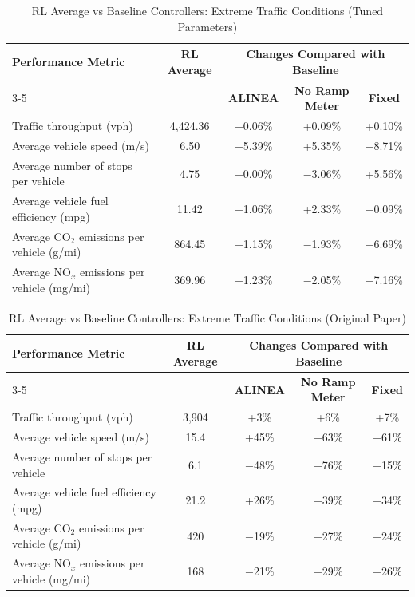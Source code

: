 \begin{table}[H]
\centering
\small
\caption{RL Average vs Baseline Controllers: Extreme Traffic Conditions (Tuned Parameters)}
\begin{tabular}{l c c c c}
\toprule
\multirow{2}{*}{\textbf{Performance Metric}} & \multirow{2}{*}{\textbf{RL Average}} & \multicolumn{3}{c}{\textbf{Changes Compared with Baseline}} \\
\cmidrule(lr){3-5}
 & & \textbf{ALINEA} & \textbf{No Ramp Meter} & \textbf{Fixed} \\
\midrule
Traffic throughput (vph)                      & 4{,}424.36 & +0.06\%    & +0.09\%   & +0.10\%   \\
Average vehicle speed (m/s)                   & 6.50       & $-$5.39\%  & +5.35\%   & $-$8.71\% \\
Average number of stops per vehicle           & 4.75       & +0.00\%    & $-$3.06\% & +5.56\%   \\
Average vehicle fuel efficiency (mpg)         & 11.42      & +1.06\%    & +2.33\%   & $-$0.09\% \\
Average CO$_2$ emissions per vehicle (g/mi)   & 864.45     & $-$1.15\%  & $-$1.93\% & $-$6.69\% \\
Average NO$_x$ emissions per vehicle (mg/mi)  & 369.96     & $-$1.23\%  & $-$2.05\% & $-$7.16\% \\
\bottomrule
\end{tabular}
\end{table}

\begin{table}[H]
\centering
\small
\caption{RL Average vs Baseline Controllers: Extreme Traffic Conditions (Original Paper)}
\begin{tabular}{l c c c c}
\toprule
\multirow{2}{*}{\textbf{Performance Metric}} & \multirow{2}{*}{\textbf{RL Average}} & \multicolumn{3}{c}{\textbf{Changes Compared with Baseline}} \\
\cmidrule(lr){3-5}
 & & \textbf{ALINEA} & \textbf{No Ramp Meter} & \textbf{Fixed} \\
\midrule
Traffic throughput (vph)                      & 3{,}904 & +3\%   & +6\%   & +7\%   \\
Average vehicle speed (m/s)                   & 15.4    & +45\%  & +63\%  & +61\%  \\
Average number of stops per vehicle           & 6.1     & $-$48\% & $-$76\% & $-$15\% \\
Average vehicle fuel efficiency (mpg)         & 21.2    & +26\%  & +39\%  & +34\%  \\
Average CO$_2$ emissions per vehicle (g/mi)   & 420     & $-$19\% & $-$27\% & $-$24\% \\
Average NO$_x$ emissions per vehicle (mg/mi)  & 168     & $-$21\% & $-$29\% & $-$26\% \\
\bottomrule
\end{tabular}
\end{table}



